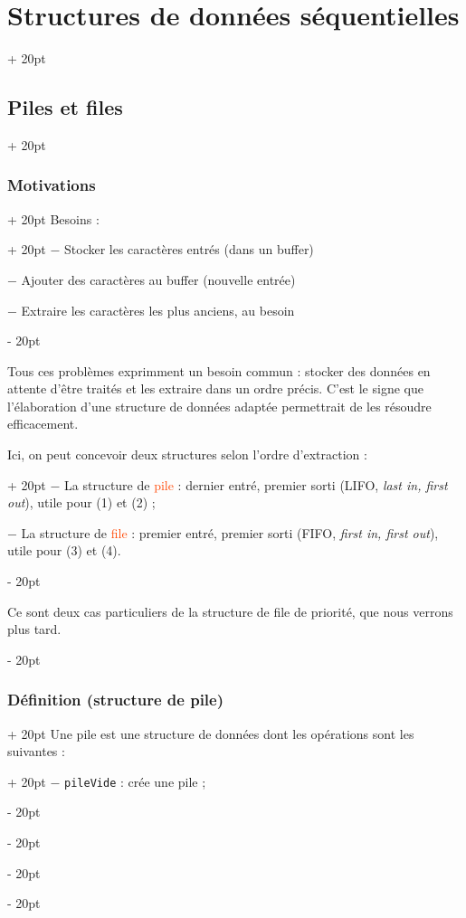 \documentclass[a4paper, 12pt, twoside]{article}
\renewcommand{\emph}{\textcolor{ff4500}}
\newcommand{\ind}[1][20pt]{\advance\leftskip + #1}
\newcommand{\deind}[1][20pt]{\advance\leftskip - #1}
\newenvironment{indt}[2][20pt]{#2 \par \ind[#1]}{\par \deind} %
\begin{document}
\begin{indt}{\section{Structures de données séquentielles}}
\begin{indt}{\subsection{Piles et files}}
\begin{indt}{\subsubsection{Motivations}}
                \begin{indt}{Besoins :}
                    $-$ Stocker les caractères entrés (dans un buffer)
                    
                    $-$ Ajouter des caractères au buffer (nouvelle entrée)
                    
                    $-$ Extraire les caractères les plus anciens, au besoin
                \end{indt}
                
                \vspace{6pt}
                
                Tous ces problèmes exprimment un besoin commun : stocker des données en attente d'être traités et les extraire dans un ordre précis. C'est le signe que l'élaboration d'une structure de données adaptée permettrait de les résoudre efficacement.
                
                \begin{indt}{Ici, on peut concevoir deux structures selon l'ordre d'extraction :}
                    $-$ La structure de \emph{pile} : dernier entré, premier sorti (LIFO, \textit{last in, first out}), utile pour (1) et (2) ;
                    
                    $-$ La structure de \emph{file} : premier entré, premier sorti (FIFO, \textit{first in, first out}), utile pour (3) et (4).
                \end{indt}
                
                \vspace{6pt}
                
                Ce sont deux cas particuliers de la structure de file de priorité, que nous verrons plus tard.
            \end{indt}
            
            \vspace{6pt}
            
            \begin{indt}{\subsubsection{Définition (structure de pile)}}
                \begin{indt}{Une pile est une structure de données dont les opérations sont les suivantes :}
                    $-$ \texttt{pileVide} : crée une pile ;
                    

\end{indt}
\end{indt}
\end{indt}
\end{indt}
\end{document}
